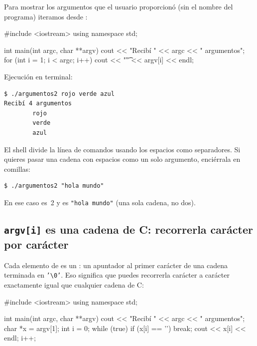 \documentclass[12pt, oneside]{article}
\begin{document}
Para mostrar los argumentos que el usuario proporcionó (sin el nombre
del programa) iteramos desde :

\begin{codigo}[caption=argumentos2.cpp]
#include <iostream>
using namespace std;

int main(int argc, char **argv){
    cout << "Recibí " << argc << " argumentos\n";
    for (int i = 1; i < argc; i++){
        cout << "\t" << argv[i] << endl;
    }
}
\end{codigo}

Ejecución en terminal:
\begin{verbatim}
$ ./argumentos2 rojo verde azul
Recibí 4 argumentos
        rojo
        verde
        azul
\end{verbatim}

\begin{recuerda}
  El shell divide la línea de comandos usando los espacios como
  separadores.  Si quieres pasar una cadena con espacios como un solo
  argumento, enciérrala en comillas:
  \begin{verbatim}
$ ./argumentos2 "hola mundo"
  \end{verbatim}
  En ese caso  es~2 y  es \texttt{"hola mundo"}
  (una sola cadena, no dos).
\end{recuerda}

\subsection{\texttt{argv[i]} es una cadena de C: recorrerla carácter por carácter}

Cada elemento de  es un : un apuntador al primer
carácter de una cadena terminada en \texttt{'\textbackslash{}0'}.  Eso
significa que puedes recorrerla carácter a carácter exactamente igual
que cualquier cadena de C:

\begin{codigo}[caption=argumentos4.cpp]
#include <iostream>
using namespace std;

int main(int argc, char **argv){
    cout << "Recibí " << argc << " argumentos\n";
    char *x = argv[1];
    int i = 0;
    while (true){
        if (x[i] == '\0') break;
        cout << x[i] << endl;
        i++;
    }
}
\end{codigo}
\end{document}
